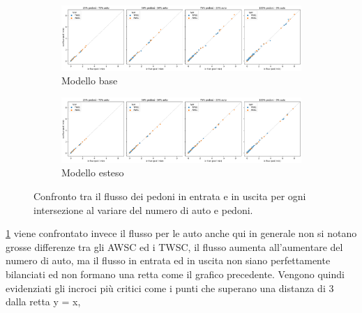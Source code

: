 \begin{figure}[ht]
    \centering
    \begin{subfigure}{0.9\textwidth}
        \centering
        \includegraphics[width=\textwidth]{images/analisi/comparison-base-in-out-flow-ped.png}
        \caption{Modello base}
    \end{subfigure}
    \hfill
    \begin{subfigure}{0.9\textwidth}
        \centering
        \includegraphics[width=\textwidth]{images/analisi/comparison-new-in-out-flow-ped.png}
        \caption{Modello esteso}
    \end{subfigure}
    \caption{
        Confronto tra il flusso dei pedoni in entrata e in uscita per ogni intersezione al variare del numero di auto e pedoni.
    }
    \label{fig:analisi-comparison-in-out-flow-ped}
\end{figure}

\ref{fig:analisi-comparison-in-out-flow-ped} viene confrontato invece il flusso per le auto anche
qui in generale non si notano grosse differenze tra gli AWSC ed i TWSC, il flusso aumenta all'aumentare del numero di auto,
ma il flusso in entrata ed in uscita non siano perfettamente bilanciati ed non
formano una retta come il grafico precedente.
Vengono quindi evidenziati gli incroci più critici come i punti che superano una distanza di 3 dalla retta y = x,

